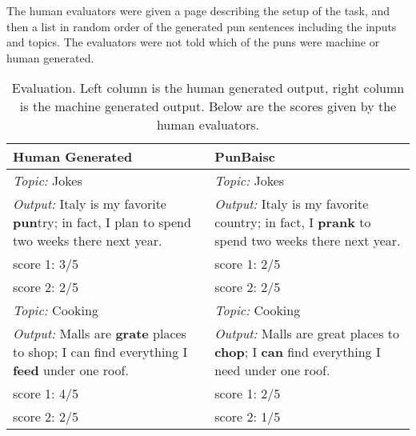 \documentclass{article}
\begin{document}
The human evaluators were given a page describing the setup of the task, and then a list in random order of the generated pun sentences including the inputs and topics. The evaluators were not told which of the puns were machine or human generated.\\ 

\begin{table}
  \centering
  \begin{tabular}{|P{7cm}|P{7cm}|}
    \hline
    Human Generated         & PunBaisc              \\ \hline
    \textit{Topic:} Jokes   & \textit{Topic:} Jokes \\
    \textit{Output:} Italy is my favorite \textbf{pun}try; in fact, I plan to spend two weeks there next year. & \textit{Output:} Italy is my favorite country; in fact, I \textbf{prank} to spend two weeks there next year. \\
    score 1: 3/5            & score 1: 2/5\\
    score 2: 2/5            & score 2: 2/5          \\ \hline
    \textit{Topic:} Cooking   & \textit{Topic:} Cooking \\
    \textit{Output:} Malls are \textbf{grate} places to shop; I can find everything I \textbf{feed} under one roof. & \textit{Output:} Malls are great places to \textbf{chop}; I \textbf{can} find everything I need under one roof. \\
    score 1: 4/5            & score 1: 2/5\\
    score 2: 2/5            & score 2: 1/5          \\ \hline
  \end{tabular}
  \newline\newline
  \caption{Evaluation. Left column is the human generated output, right column is the machine generated output. Below are the scores given by the human evaluators.}\label{tab1}
\end{table}
\end{document}
